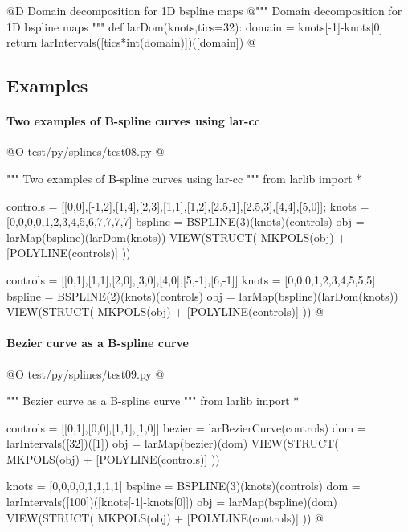 \documentclass[11pt,oneside]{article}	%
\begin{document}
@D Domain decomposition for 1D bspline maps
@{""" Domain decomposition for 1D bspline maps """
def larDom(knots,tics=32): 
	domain = knots[-1]-knots[0]
	return larIntervals([tics*int(domain)])([domain])
@}

\subsection{Examples}

\paragraph{Two examples of B-spline curves using lar-cc}

@O test/py/splines/test08.py
@{""" Two examples of B-spline curves using lar-cc """
from larlib import *

controls = [[0,0],[-1,2],[1,4],[2,3],[1,1],[1,2],[2.5,1],[2.5,3],[4,4],[5,0]];
knots = [0,0,0,0,1,2,3,4,5,6,7,7,7,7]
bspline = BSPLINE(3)(knots)(controls)
obj = larMap(bspline)(larDom(knots))
VIEW(STRUCT( MKPOLS(obj) + [POLYLINE(controls)] ))

controls = [[0,1],[1,1],[2,0],[3,0],[4,0],[5,-1],[6,-1]]
knots = [0,0,0,1,2,3,4,5,5,5]
bspline = BSPLINE(2)(knots)(controls)
obj = larMap(bspline)(larDom(knots))
VIEW(STRUCT( MKPOLS(obj) + [POLYLINE(controls)] ))
@}


\paragraph{Bezier curve as a B-spline curve}

@O test/py/splines/test09.py
@{""" Bezier curve as a B-spline curve """
from larlib import *

controls = [[0,1],[0,0],[1,1],[1,0]]
bezier = larBezierCurve(controls)
dom = larIntervals([32])([1])
obj = larMap(bezier)(dom)
VIEW(STRUCT( MKPOLS(obj) + [POLYLINE(controls)] ))

knots = [0,0,0,0,1,1,1,1]
bspline = BSPLINE(3)(knots)(controls)
dom = larIntervals([100])([knots[-1]-knots[0]])
obj = larMap(bspline)(dom)
VIEW(STRUCT( MKPOLS(obj) + [POLYLINE(controls)] ))
@}
\end{document}
